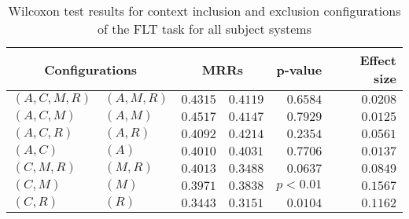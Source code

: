 
\begin{table}
\begin{spacing}{1.2}
\centering
\caption{Wilcoxon test results for context inclusion and exclusion configurations of the FLT task for all subject systems}
\label{table:versus-wilcox-all-flt-context}
\begin{tabular}{ll|rr|rr}
\toprule
      \multicolumn{2}{c|}{Configurations} &          \multicolumn{2}{c|}{MRRs} &       p-value & Effect size \\
\midrule
 $(A,C,M,R)$ &  $(A,M,R)$ & $0.4315$ & $0.4119$ & $0.6584$ &    $0.0208$ \\
   $(A,C,M)$ &    $(A,M)$ & $0.4517$ & $0.4147$ & $0.7929$ &    $0.0125$ \\
   $(A,C,R)$ &    $(A,R)$ & $0.4092$ & $0.4214$ & $0.2354$ &    $0.0561$ \\
     $(A,C)$ &      $(A)$ & $0.4010$ & $0.4031$ & $0.7706$ &    $0.0137$ \\
   $(C,M,R)$ &    $(M,R)$ & $0.4013$ & $0.3488$ & $0.0637$ &    $0.0849$ \\
     $(C,M)$ &      $(M)$ & $0.3971$ & $0.3838$ & $p<0.01$ &    $0.1567$ \\
     $(C,R)$ &      $(R)$ & $0.3443$ & $0.3151$ & $0.0104$ &    $0.1162$ \\
\bottomrule
\end{tabular}

\end{spacing}
\end{table}

